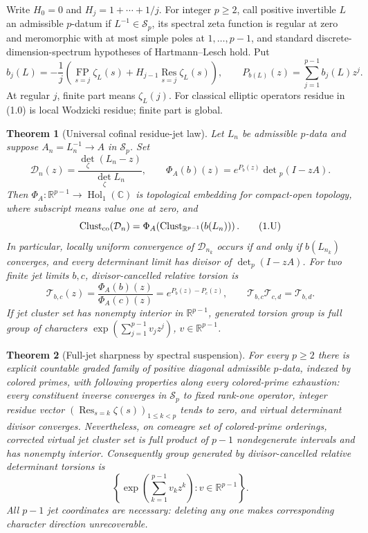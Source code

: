 \documentclass[11pt]{article}
\newtheorem{theorem}{Theorem}[section]
\theoremstyle{definition}
\theoremstyle{remark}
\newcommand{\R}{\mathbb R}
\newcommand{\C}{\mathbb C}
\newcommand{\Res}{\operatorname*{Res}}
\newcommand{\FP}{\operatorname*{FP}}
\begin{document}
Write $H_0=0$ and $H_j=1+\cdots+1/j$.  For integer $p\geq2$, call positive invertible
$L$ an admissible $p$-datum if $L^{-1}\in\mathcal S_p$, its spectral zeta function is regular
at zero and meromorphic with at most simple poles at $1,\ldots,p-1$, and standard
discrete-dimension-spectrum hypotheses of Hartmann--Lesch hold.  Put
\begin{equation}
 b_j(L)=-\frac1j\left(\FP_{s=j}\zeta_L(s)
     +H_{j-1}\Res_{s=j}\zeta_L(s)\right),\qquad
 P_{b(L)}(z)=\sum_{j=1}^{p-1}b_j(L)z^j.                 \tag{1.0}
\end{equation}
At regular $j$, finite part means $\zeta_L(j)$.  For classical elliptic operators residue in
(1.0) is local Wodzicki residue; finite part is global.

\begin{theorem}[Universal cofinal residue-jet law]
\label{thm:universal-law}
Let $L_n$ be admissible $p$-data and suppose $A_n=L_n^{-1}\to A$ in $\mathcal S_p$.  Set
\[
 \mathcal D_n(z)=\frac{\det_\zeta(L_n-z)}{\det_\zeta L_n},\qquad
 \Phi_A(b)(z)=e^{P_b(z)}\det{}_p(I-zA).
\]
Then $\Phi_A:\R^{p-1}\to\operatorname{Hol}_1(\C)$ is topological embedding for compact-open
topology, where subscript means value one at zero, and
\[
 \operatorname{Clust}_{\rm co}(\mathcal D_n)
 =\Phi_A\!\left(\operatorname{Clust}_{\R^{p-1}}(b(L_n))\right). \tag{1.U}
\]
In particular, locally uniform convergence of $\mathcal D_{n_k}$ occurs if and only if
$b(L_{n_k})$ converges, and every determinant limit has divisor of $\det_p(I-zA)$.  For two
finite jet limits $b,c$, divisor-cancelled relative torsion is
\[
 \mathcal T_{b,c}(z)=\frac{\Phi_A(b)(z)}{\Phi_A(c)(z)}
 =e^{P_b(z)-P_c(z)},\qquad
 \mathcal T_{b,c}\mathcal T_{c,d}=\mathcal T_{b,d}.      \tag{1.T}
\]
If jet cluster set has nonempty interior in $\R^{p-1}$, generated torsion group is full group of
characters $\exp(\sum_{j=1}^{p-1}v_jz^j)$, $v\in\R^{p-1}$.
\end{theorem}

\begin{theorem}[Full-jet sharpness by spectral suspension]
\label{thm:full-jet}
For every $p\geq2$ there is explicit countable graded family of positive diagonal admissible
$p$-data, indexed by colored primes, with following properties along every colored-prime
exhaustion: every constituent inverse converges in $\mathcal S_p$ to fixed rank-one operator,
integer residue vector $(\Res_{s=k}\zeta(s))_{1\leq k<p}$ tends to zero, and virtual determinant
divisor converges.  Nevertheless, on comeagre set of colored-prime orderings, corrected virtual
jet cluster set is full product of $p-1$ nondegenerate intervals and has nonempty interior.
Consequently group generated by divisor-cancelled relative determinant torsions is
\[
 \left\{\exp\!\left(\sum_{k=1}^{p-1}v_kz^k\right):v\in\R^{p-1}\right\}. \tag{1.F}
\]
All $p-1$ jet coordinates are necessary: deleting any one makes corresponding character
direction unrecoverable.
\end{theorem}
\end{document}

